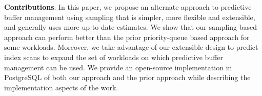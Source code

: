 \textbf{Contributions}: In this paper, we propose an alternate approach to predictive buffer management using sampling that is simpler, more flexible and extensible, and generally uses more up-to-date estimates. We show that our sampling-based approach can perform better than the prior priority-queue based approach for some workloads. Moreover, we take advantage of our extensible design to predict index scans to expand the set of workloads on which predictive buffer management can be used. We provide an open-source implementation in PostgreSQL of both our approach and the prior approach \cite{pbm} while describing the implementation aspects of the work.
